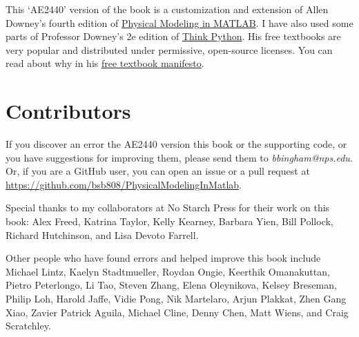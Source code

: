 This `AE2440' version of the book is a customization and extension of Allen Downey's fourth edition of \href{https://greenteapress.com/wp/physical-modeling-in-matlab/}{Physical Modeling in MATLAB}.  I have also used some parts of Professor Downey's 2e edition of \href{https://greenteapress.com/wp/think-python-2e/}{Think Python}.   His free textbooks are very popular and distributed under permissive, open-source licenses.  You can read about why in his \href{https://greenteapress.com/free_books.html}{free textbook manifesto}.

\section*{Contributors}

If you discover an error the AE2440 version this book or the supporting code, or you have suggestions for improving them, please send them to \emph{bbingham@nps.edu}. Or, if you are a GitHub user, you can open an issue or a pull request at \url{https://github.com/bsb808/PhysicalModelingInMatlab}.
    
Special thanks to my collaborators at No Starch Press for their work on this book: Alex Freed, Katrina Taylor, Kelly Kearney, Barbara Yien, Bill Pollock, Richard Hutchinson, and Lisa Devoto Farrell.

Other people who have found errors and helped improve this book include
Michael Lintz,
Kaelyn Stadtmueller,
Roydan Ongie,
Keerthik Omanakuttan,
Pietro Peterlongo,
Li Tao,
Steven Zhang,
Elena Oleynikova,
Kelsey Breseman,
Philip Loh,
Harold Jaffe,
Vidie Pong,
Nik Martelaro,
Arjun Plakkat,
Zhen Gang Xiao,
Zavier Patrick Aguila,
Michael Cline,
Denny Chen,
Matt Wiens,
and Craig Scratchley.

